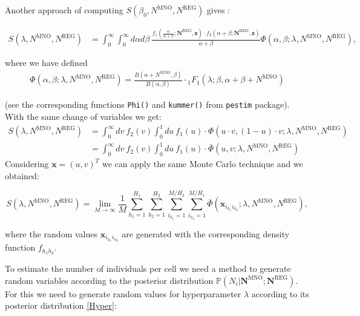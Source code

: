 \documentclass[12pt, a4paper]{article}
\begin{document}
Another approach of computing $S(\beta_{0}, N^{\textrm{MNO}}, N^{\textrm{REG}})$ gives \cite{methodology}:

\begin{align}
S(\lambda, N^{\textrm{MNO}}, N^{\textrm{REG}})&=\int_{0}^{\infty}\int_{0}^{\infty}d\alpha d\beta\ \frac{f_{1}(\frac{\alpha}{\alpha+\beta}; \mathbf{N}^{\textrm{REG}}, \mathbf{z})\cdot f_{2}(\alpha+\beta; \mathbf{N}^{\textrm{REG}}, \mathbf{z})}{\alpha+\beta}\Phi(\alpha, \beta; \lambda, N^{\textrm{MNO}}, N^{\textrm{REG}}),
\end{align}

\noindent where we have defined 
\begin{align}\label{ratioB} 
\Phi(\alpha, \beta; \lambda, N^{\textrm{MNO}}, N^{\textrm{REG}}) = \frac{B(\alpha + N^{\textrm{MNO}}, \beta)}{B(\alpha, \beta)}\cdot {}_{1}F_{1}(\lambda; \beta, \alpha+\beta +N^{\textrm{MNO}})
\end{align}

(see the corresponding functions \texttt{Phi()} and \texttt{kummer()} from \texttt{pestim} package). 
With the same change of variables we get:
\begin{align}
S(\lambda, N^{\textrm{MNO}}, N^{\textrm{REG}})&=\int_{0}^{\infty}dv\ f_{2}(v)\int_{0}^{1} du\ f_{1}(u)\cdot \Phi(u\cdot v, (1-u)\cdot v; \lambda, N^{\textrm{MNO}}, N^{\textrm{REG}})\nonumber\\
&=\int_{0}^{\infty}dv\ f_{2}(v)\int_{0}^{1} du\ f_{1}(u) \cdot\bar{\Phi}(u, v; \lambda, N^{\textrm{MNO}}, N^{\textrm{REG}})
\end{align}
Considering $\mathbf{x}=(u,v)^{T}$ we can apply the same Monte Carlo technique and we obtained:

\begin{equation}\label{montecarlo}
S(\lambda, N^{\textrm{MNO}}, N^{\textrm{REG}})=\lim_{M\to\infty}\frac{1}{M}\sum_{h_{1}=1}^{H_{1}}\sum_{h_{2}=1}^{H_{2}}\sum_{i_{h_{1}}=1}^{M/H_{2}}\sum_{i_{h_{2}}=1}^{M/H_{1}}\bar{\Phi}(\mathbf{x}_{i_{h_{1}}i_{h_{2}}}; \lambda, N^{\textrm{MNO}}, N^{\textrm{REG}}),
\end{equation}

\noindent where the random values $\mathbf{x}_{i_{h_{1}}i_{h_{2}}}$ are generated with the corresponding density function $f_{h_{1}h_{2}}$.

To estimate the number of individuals per cell we need a method to generate random variables 
according to the posterior distribution $\mathbb{P}\left(N_{i}|\mathbf{N}^{\textrm{MNO}};\mathbf{N}^{\textrm{REG}}\right)$. 
For this we need to generate random values for 
hyperparameter $\lambda$ according to its posterior distribution \eqref{Hyper}:
\end{document}
